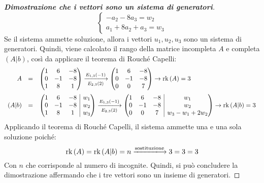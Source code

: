 \documentclass[a4paper]{article}
\makeatletter
\DeclareMathOperator{\rk}{rk}
\newenvironment{rowequmat}[1]{\left(\array{@{}#1@{}}}{\endarray\right)}
\makeatother
\begin{document}
\begin{proof}[\textbf{Dimostrazione che i vettori sono un sistema di generatori}]
\begin{equation*}
\begin{cases}
				-a_{2} - 8a_{3} = w_{2} \\
				a_{1} + 8a_{2} + a_{3} = w_{3}
			\end{cases}
		\end{equation*}
		Se il sistema ammette soluzione, allora i vettori $u_{1}, u_{2}, u_{3}$ sono un sistema di generatori. Quindi, viene calcolato il rango della matrice incompleta $A$ e completa $\left(A|b\right)$, così da applicare il teorema di Rouché Capelli:
		\begin{equation*}
				\begin{array}{rll}
					A &=& \begin{rowequmat}{ccc}
						1 &  6 & -8 \\
						0 & -1 & -8 \\
						1 &  8 &  1
					\end{rowequmat} \xlongrightarrow[E_{2,3}\left(2\right)]{E_{1,3}\left(-1\right)}
					\begin{rowequmat}{ccc}
						1 &  6 & -8 \\
						0 & -1 & -8 \\
						0 &  0 &  7
					\end{rowequmat} \rightarrow \rk\left(A\right) = 3 \\ [1.8em]
					\left(A|b\right) &=& \begin{rowequmat}{ccc|c}
						1 &  6 & -8 & w_{1} \\
						0 & -1 & -8 & w_{2} \\
						1 &  8 &  1 & w_{3}
					\end{rowequmat} \xlongrightarrow[E_{2,3}\left(2\right)]{E_{1,3}\left(-1\right)}
					\begin{rowequmat}{ccc|c}
						1 &  6 & -8 & w_{1} \\
						0 & -1 & -8 & w_{2} \\
						0 &  0 &  7 & w_{3} - w_{1} + 2w_{2}
					\end{rowequmat} \rightarrow \rk\left(A|b\right) = 3
				\end{array}
		\end{equation*}
		Applicando il teorema di Rouché Capelli, il sistema ammette una e una sola soluzione poiché:
		\begin{equation*}
			\rk\left(A\right) = \rk\left(A|b\right) = n \xlongrightarrow{\text{sostituzione}} 3 = 3 = 3
		\end{equation*}
		Con $n$ che corrisponde al numero di incognite. Quindi, si può concludere la dimostrazione affermando che i tre vettori sono un insieme di generatori.
	\end{proof}\newpage
	
\end{document}
